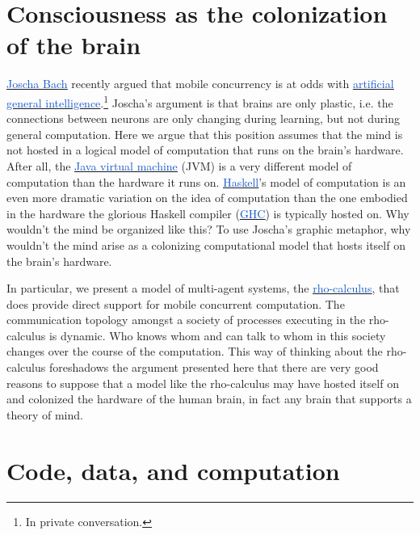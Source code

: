 \section{Consciousness as the colonization of the brain}

\href{https://en.wikipedia.org/wiki/Joscha_Bach}{\uline{\textcolor[HTML]{1155CC}{Joscha Bach}}} recently argued that mobile concurrency is at odds with \href{https://en.wikipedia.org/wiki/Artificial_general_intelligence}{\uline{\textcolor[HTML]{1155CC}{artificial general intelligence}}}.\footnote{In private conversation.} Joscha’s argument is that brains are only plastic, i.e. the connections between neurons are only changing during learning, but not during general computation. Here we argue that this position assumes that the mind is not hosted in a logical model of computation that runs on the brain’s hardware. After all, the \href{https://en.wikipedia.org/wiki/Java_virtual_machine}{\uline{\textcolor[HTML]{1155CC}{Java virtual machine}}} (JVM) is a very different model of computation than the hardware it runs on. \href{https://en.wikipedia.org/wiki/Haskell}{\uline{\textcolor[HTML]{1155CC}{Haskell}}}’s model of computation is an even more dramatic variation on the idea of computation than the one embodied in the hardware the glorious Haskell compiler (\href{https://en.wikipedia.org/wiki/GHC}{\uline{\textcolor[HTML]{1155CC}{GHC}}}) is typically hosted on. Why wouldn’t the mind be organized like this? To use Joscha’s graphic metaphor, why wouldn’t the mind arise as a colonizing computational model that hosts itself on the brain’s hardware. 

\vspace{1\baselineskip}
In particular, we present a model of multi-agent systems, the \href{https://www.sciencedirect.com/science/article/pii/S1571066105051893}{\uline{\textcolor[HTML]{1155CC}{rho-calculus}}}, that does provide direct support for mobile concurrent computation. The communication topology amongst a society of processes executing in the rho-calculus is dynamic. Who knows whom and can talk to whom in this society changes over the course of the computation. This way of thinking about the rho-calculus foreshadows the argument presented here that there are very good reasons to suppose that a model like the rho-calculus may have hosted itself on and colonized the hardware of the human brain, in fact any brain that supports a theory of mind. 

\vspace{1\baselineskip}
\section{Code, data, and computation}

